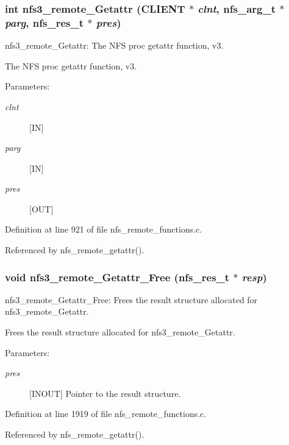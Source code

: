 \subsubsection{\setlength{\rightskip}{0pt plus 5cm}int nfs3\_\-remote\_\-Getattr (CLIENT $\ast$ {\em clnt}, nfs\_\-arg\_\-t $\ast$ {\em parg}, nfs\_\-res\_\-t $\ast$ {\em pres})}\label{group__NFSprocs_ga19}


nfs3\_\-remote\_\-Getattr: The NFS proc getattr function, v3.

The NFS proc getattr function, v3.

\begin{Desc}
\item[Parameters:]
\begin{description}
\item[{\em clnt}][IN] \item[{\em parg}][IN] \item[{\em pres}][OUT] \end{description}
\end{Desc}


Definition at line 921 of file nfs\_\-remote\_\-functions.c.

Referenced by nfs\_\-remote\_\-getattr().
\subsubsection{\setlength{\rightskip}{0pt plus 5cm}void nfs3\_\-remote\_\-Getattr\_\-Free (nfs\_\-res\_\-t $\ast$ {\em resp})}\label{group__NFSprocs_ga73}


nfs3\_\-remote\_\-Getattr\_\-Free: Frees the result structure allocated for nfs3\_\-remote\_\-Getattr.

Frees the result structure allocated for nfs3\_\-remote\_\-Getattr.

\begin{Desc}
\item[Parameters:]
\begin{description}
\item[{\em pres}][INOUT] Pointer to the result structure. \end{description}
\end{Desc}


Definition at line 1919 of file nfs\_\-remote\_\-functions.c.

Referenced by nfs\_\-remote\_\-getattr().
